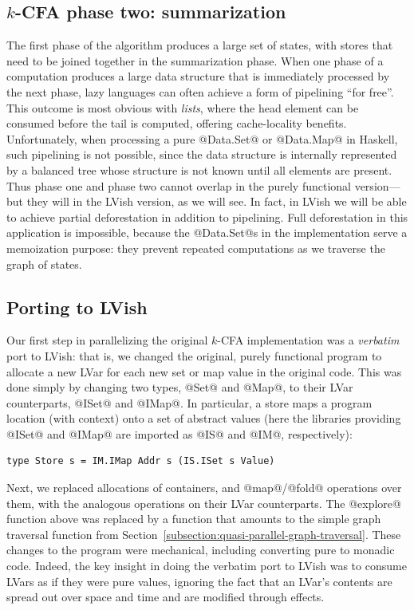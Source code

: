 \subsection{$k$-CFA phase two: summarization}

The first phase of the algorithm produces a large set of states, with
stores that need to be joined together in the summarization phase.
When one phase of a computation produces a large data structure that
is immediately processed by the next phase, lazy languages can often
achieve a form of pipelining ``for free''.  This outcome is most
obvious with \emph{lists}, where the head element can be consumed
before the tail is computed, offering cache-locality benefits.
Unfortunately, when processing a pure @Data.Set@ or @Data.Map@ in
Haskell, such pipelining is not possible, since the data structure is
internally represented by a balanced tree whose structure is not known
until all elements are present.  Thus phase one and phase two cannot
overlap in the purely functional version---but they will in the LVish
version, as we will see.  In fact, in LVish we will be able to achieve
partial deforestation in addition to pipelining.  Full deforestation
in this application is impossible, because the @Data.Set@s in the
implementation serve a memoization purpose: they prevent repeated
computations as we traverse the graph of states.

\subsection{Porting to LVish}

Our first step in parallelizing the original $k$-CFA implementation
was a \emph{verbatim} port to LVish: that is, we changed the original,
purely functional program to allocate a new LVar for each new set or
map value in the original code.  This was done simply by changing two
types, @Set@ and @Map@, to their LVar counterparts, @ISet@ and @IMap@.
In particular, a store maps a program location (with context) onto a
set of abstract values (here the libraries providing @ISet@ and @IMap@
are imported as @IS@ and @IM@, respectively):

\singlespacing
\begin{lstlisting}
type Store s = IM.IMap Addr s (IS.ISet s Value)
\end{lstlisting}
\doublespacing

Next, we replaced allocations of containers, and @map@/@fold@
operations over them, with the analogous operations on their LVar
counterparts.  The @explore@ function above was replaced by a function
that amounts to the simple graph traversal function from
Section~\ref{subsection:quasi-parallel-graph-traversal}.  These
changes to the program were mechanical, including converting pure to
monadic code.  Indeed, the key insight in doing the verbatim port to
LVish was to consume LVars as if they were pure values, ignoring the
fact that an LVar's contents are spread out over space and time and
are modified through effects.


